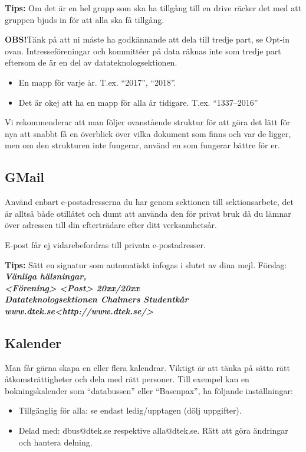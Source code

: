 \documentclass[a4paper]{dtek}
\begin{document}
\textbf{Tips:} Om det är en hel grupp som ska ha tillgång till en drive räcker det med att gruppen bjuds in för att alla ska få tillgång.

\textbf{OBS!}Tänk på att ni måste ha godkännande att dela till tredje part, se Opt-in ovan. Intresseföreningar och kommittéer på data räknas inte som tredje part eftersom de är en del av datateknologsektionen.

\begin{itemize}
    \item En mapp för varje år. T.ex. “2017”, “2018”.
    \item Det är okej att ha en mapp för alla år tidigare. T.ex. “1337–2016”
\end{itemize}

Vi rekommenderar att man följer ovanstående struktur för att göra det lätt för nya att
snabbt få en överblick över vilka dokument som finns och var de ligger, men om den
strukturen inte fungerar, använd en som fungerar bättre för er.

\subsection{GMail}
Använd enbart e-postadresserna du har genom sektionen till sektionsarbete, det är alltså
både otillåtet och dumt att använda den för privat bruk då du lämnar över adressen till
din efterträdare efter ditt verksamhetsår.

E-post får ej vidarebefordras till privata e-postadresser.

\textbf{Tips:} Sätt en signatur som automatiskt infogas i slutet av dina mejl. Förslag:\\
\textbf{\textit{Vänliga hälsningar,\\
<Förening> <Post> 20xx/20xx\\
Datateknologsektionen Chalmers Studentkår\\
www.dtek.se<http://www.dtek.se/>}}

\subsection{Kalender}
Man får gärna skapa en eller flera kalendrar. Viktigt är att tänka på sätta rätt åtkomsträttigheter och dela med rätt personer. Till exempel kan en bokningskalender som “databussen” eller “Basenpax”, ha följande inställningar:
\begin{itemize}
    \item Tillgänglig för alla: se endast ledig/upptagen (dölj uppgifter).
    \item Delad med: dbus@dtek.se respektive alla@dtek.se. Rätt att göra ändringar och hantera delning.
\end{itemize}
\end{document}
